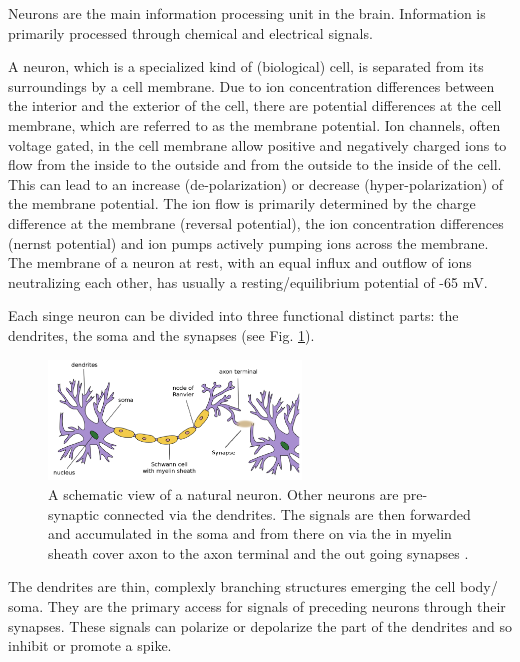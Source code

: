 Neurons are the main information processing unit in the brain\cite{gerstner2014neuronal}\cite{Byrne1997}. 
Information is primarily processed through chemical and electrical signals.

A neuron, which is a specialized kind of (biological) cell, is separated from its surroundings by a cell membrane.   
Due to ion concentration differences between the interior and the exterior of the cell, there are potential differences at the cell membrane, which are referred to as the membrane potential. 
Ion channels, often voltage gated, in the cell membrane allow positive and negatively charged ions to flow from the inside to the outside and from the outside to the inside of the cell.
This can lead to an increase (de-polarization) or decrease (hyper-polarization) of the membrane potential.
The ion flow is primarily determined by the charge difference at the membrane (reversal potential), the ion concentration differences (nernst potential) and ion pumps actively pumping ions across the membrane.
The membrane of a neuron at rest, with an equal influx and outflow of ions neutralizing each other, has usually a resting/equilibrium potential of -65 mV. 

Each singe neuron can be divided into three functional distinct parts: the dendrites, the soma and the synapses (see Fig. \ref{fig:neuron}).

\begin{figure}[h]
	\centering
    	\includegraphics[width=0.6\textwidth]{imgs/neuron.png} 
    \caption{A schematic view of a natural neuron. Other neurons are pre-synaptic connected via the dendrites. The signals are then forwarded and accumulated in the soma and from there on via the in myelin sheath cover axon to the axon terminal and the out going synapses \cite{neuronImg}.}
	\label{fig:neuron}
\end{figure}

The dendrites are thin, complexly branching structures emerging the cell body/ soma.
They are the primary access for signals of preceding neurons through their synapses. 
These signals can polarize or depolarize the part of the dendrites and so inhibit or promote a spike. 

